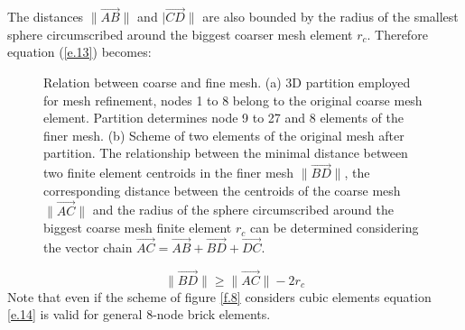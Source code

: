   The distances $\|\vec{AB}\|$ and $|\vec{CD}\|$ are also bounded by the radius of the smallest sphere circumscribed around the biggest coarser mesh element $r_{c}$. Therefore equation (\ref{e.13}) becomes:
    \begin{figure}[hbt!]
    \centering
    \caption{Relation between coarse and fine mesh.
    (a) 3D partition employed for mesh refinement, nodes 1 to 8 belong to the original coarse mesh element. Partition determines node 9 to 27 and 8 elements of the finer mesh.  (b) Scheme of two elements of the original mesh after partition. The relationship between the minimal distance between two finite element centroids in the finer mesh $\|\vec{BD}\|$, the corresponding distance between the centroids of the coarse mesh $\|\vec{AC}\|$ and the radius of the sphere circumscribed around the biggest coarse mesh finite element $r_c$ can be determined considering the vector chain $\vec{AC}=\vec{AB}+\vec{BD}+\vec{DC}$.} 
    \end{figure}
 \begin{equation}
  \label{e.14}
  \|\vec{BD}\|\geq \|\vec{AC}\|-2r_{c}
  \end{equation}
  Note that even if the scheme of figure \ref{f.8} considers cubic elements equation \ref{e.14} is valid for general 8-node brick elements.
